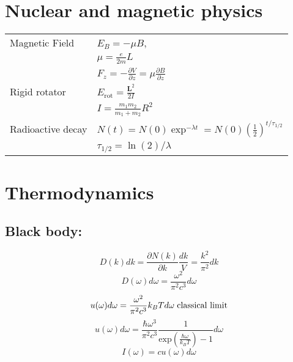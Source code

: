 \documentclass[12pt,a4paper]{article}
\begin{document}
	
	\section*{Nuclear and magnetic physics}
	\begin{tabular}{ll}
		{Magnetic Field} & \(E_B = - \mu B \), \\
		& \( \mu = \frac{e}{2m} L\)\\
		& \( F_z = - \frac{\partial V}{\partial z} = \mu \frac{\partial B}{\partial z}  \)\\
		{Rigid rotator} & \(E_\text{rot} = \frac{\textbf{L}^2}{2I}\) \\
		& \( I = \frac{m_1 m_2 }{m_1 + m_2} R^2 \) \\
		{Radioactive decay} & \( N(t) = N(0) \exp ^ {-\lambda t} = N(0) (\frac{1}{2})^{t/\tau _{1/2}}\)\\
		& \( \tau _{1/2} = \ln (2) / \lambda\)\\
	\end{tabular}
	
	\section*{Thermodynamics}
	\subsection*{Black body:}
	\begin{equation*}
		D(k) dk = \frac{\partial N(k)}{\partial k} \frac{dk}{V} = \frac{k^2}{\pi^2} dk
	\end{equation*}
	\begin{equation*}
		D(\omega) d\omega = \frac{\omega^2}{\pi^2 c^3} d\omega
	\end{equation*}
	\begin{equation*}
		u(\omega) d\omega = \frac{\omega^2}{\pi^2 c^3} k_B T d\omega \hspace*{3pt}\text{classical limit}
	\end{equation*}
		\begin{equation*}
		u(\omega) d\omega = \frac{\hbar \omega^3}{\pi^2 c^3} \frac{1}{\text{exp}(\frac{\hbar \omega}{k_B T})-1} d\omega
	\end{equation*}
	\begin{equation*}
		I(\omega) = c u(\omega) d\omega
	\end{equation*}
	
	
	
\end{document}

